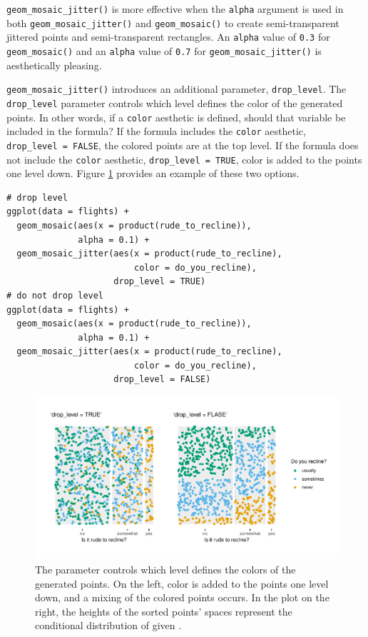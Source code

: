 \texttt{geom\_mosaic\_jitter()} is more effective when the \texttt{alpha} argument is used in both \texttt{geom\_mosaic\_jitter()} and \texttt{geom\_mosaic()} to create semi-transparent jittered points and semi-transparent rectangles. An \texttt{alpha} value of \texttt{0.3} for \texttt{geom\_mosaic()} and an \texttt{alpha} value of \texttt{0.7} for \texttt{geom\_mosaic\_jitter()} is aesthetically pleasing.

\texttt{geom\_mosaic\_jitter()} introduces an additional parameter, \texttt{drop\_level}. The \texttt{drop\_level} parameter controls which level defines the color of the generated points. In other words, if a \texttt{color} aesthetic is defined, should that variable be included in the formula? If the formula includes the \texttt{color} aesthetic, \texttt{drop\_level\ =\ FALSE}, the colored points are at the top level. If the formula does not include the \texttt{color} aesthetic, \texttt{drop\_level\ =\ TRUE}, color is added to the points one level down. Figure \ref{fig:leveldown} provides an example of these two options.

\begin{verbatim}
# drop level
ggplot(data = flights) +
  geom_mosaic(aes(x = product(rude_to_recline)), 
              alpha = 0.1) +
  geom_mosaic_jitter(aes(x = product(rude_to_recline), 
                         color = do_you_recline),
                     drop_level = TRUE)
# do not drop level
ggplot(data = flights) +
  geom_mosaic(aes(x = product(rude_to_recline)), 
              alpha = 0.1) +
  geom_mosaic_jitter(aes(x = product(rude_to_recline), 
                         color = do_you_recline),
                     drop_level = FALSE)
\end{verbatim}

\begin{figure}

{\centering \includegraphics[width=1\linewidth]{RJ-2023-013_files/figure-latex/leveldown-1} 

}

\caption{The parameter  controls which level defines the colors of the generated points. On the left, color is added to the points one level down, and a mixing of the colored points occurs. In the plot on the right, the heights of the sorted points' spaces represent the conditional distribution of  given . }\label{fig:leveldown}
\end{figure}

